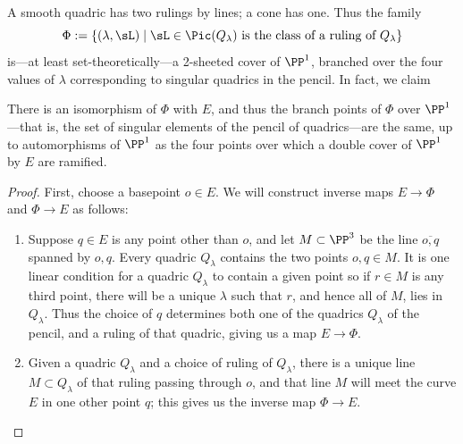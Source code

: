  A smooth quadric has two rulings by lines; a cone has one. Thus the family
$$
\Phi := \{ (\lambda, \sL) \mid \sL \in \Pic(Q_\lambda) \text{ is the class of a ruling of } Q_\lambda \}
$$
is---at least set-theoretically---a 2-sheeted cover of $\PP^1$, branched over the four values of $\lambda$ corresponding to singular quadrics in the pencil. In fact, we claim

\begin{proposition}\label{rulings on pencil}
There is an isomorphism of $\Phi$ with $E$, and thus the branch points of $\Phi$ over $\PP^1$---that is, the set of singular elements of the pencil of quadrics---are the same, up to automorphisms of $\PP^1$ as the four points over which a double cover of $\PP^1$ by $E$ are ramified.
\end{proposition} 


\begin{proof}
First, choose a basepoint $o \in E$. We will construct inverse maps $E \to \Phi$ and $\Phi \to E$ as follows:
\begin{enumerate}

\item Suppose $q \in E$ is any point other than $o$, and let $M\subset \PP^3$ be the line $\overline{o,q}$ spanned by $o,q$. Every quadric $Q_\lambda$ contains the two points $o, q \in M$. It is one linear condition
for a quadric $Q_{\lambda}$ to contain a given point  so if $r\in M$ is any third point, there will be a unique $\lambda$ such that $r$, and hence all of $M$, lies in $Q_\lambda$. Thus the choice of $q$ determines both one of the quadrics $Q_\lambda$ of the pencil, and a ruling of that quadric, giving us a map $E \to \Phi$.

\item  Given a quadric $Q_\lambda$ and a choice of ruling of $Q_\lambda$, there is a unique line $M \subset Q_\lambda$ of that ruling passing through $o$, and that line $M$ will meet the curve $E$ in one other point $q$; this gives us the inverse map $\Phi \to E$.
\end{enumerate}
\end{proof}


